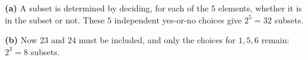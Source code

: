 \textbf{(a)} A subset is determined by deciding, for each of the $5$ elements, whether it is in the subset or not. These $5$ independent yes-or-no choices give $2^5=\boxed{32}$ subsets.

\textbf{(b)} Now $23$ and $24$ must be included, and only the choices for $1,5,6$ remain: $2^3=\boxed{8}$ subsets.
